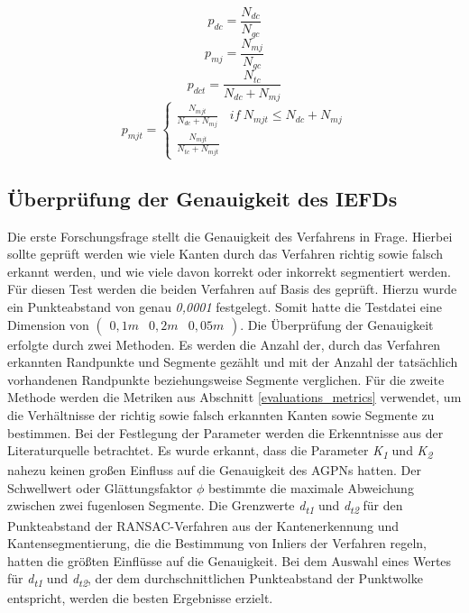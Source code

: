 \begin{equation}
	\label{pdc}
	p_{dc} = \frac{N_{dc}}{N_{gc}}
\end{equation}
\begin{equation}
	\label{pmj}
	p_{mj} = \frac{N_{mj}}{N_{gc}}
\end{equation}
\begin{equation}
	\label{pdct}
	p_{dct} = \frac{N_{tc}}{N_{dc} + N_{mj}}
\end{equation}
\begin{equation}
	\label{pmjt}
	p_{mjt} =
	\begin{cases}
		\frac{N_{mjt}}{N_{dc} + N_{mj}} & if\ N_{mjt} \leq N_{dc} + N_{mj}\\
		\frac{N_{mjt}}{N_{tc} + N_{mjt}}
	\end{cases}
\end{equation}

\subsection{Überprüfung der Genauigkeit des IEFDs}
Die erste Forschungsfrage stellt die Genauigkeit des Verfahrens in Frage. Hierbei sollte geprüft werden wie viele Kanten durch das Verfahren richtig sowie falsch erkannt werden, und wie viele davon korrekt oder inkorrekt segmentiert werden. Für diesen Test werden die beiden Verfahren auf Basis des \testcloud geprüft. Hierzu wurde ein Punkteabstand von genau \textit{0,0001} festgelegt. Somit hatte die Testdatei eine Dimension von $\left(\begin{smallmatrix}
	0,1m & 0,2m & 0,05m
\end{smallmatrix}\right)$. Die Überprüfung der Genauigkeit erfolgte durch zwei Methoden. Es werden die Anzahl der, durch das Verfahren erkannten Randpunkte und Segmente gezählt und mit der Anzahl der tatsächlich vorhandenen Randpunkte beziehungsweise Segmente verglichen. Für die zweite Methode werden die Metriken aus Abschnitt \ref{evaluations_metrics} verwendet, um die Verhältnisse der richtig sowie falsch erkannten Kanten sowie Segmente zu bestimmen. Bei der Festlegung der Parameter werden die Erkenntnisse aus der Literaturquelle betrachtet. Es wurde erkannt, dass die Parameter \textit{K\textsubscript{1}} und \textit{K\textsubscript{2}} nahezu keinen großen Einfluss auf die Genauigkeit des AGPNs hatten. Der Schwellwert oder Glättungsfaktor $\phi$ bestimmte die maximale Abweichung zwischen zwei fugenlosen Segmente. Die Grenzwerte \textit{d\textsubscript{t1}} und \textit{d\textsubscript{t2}} für den Punkteabstand der RANSAC-Verfahren aus der Kantenerkennung und Kantensegmentierung, die die Bestimmung von Inliers der Verfahren regeln, hatten die größten Einflüsse auf die Genauigkeit. Bei dem Auswahl eines Wertes für \textit{d\textsubscript{t1}} und \textit{d\textsubscript{t2}}, der dem durchschnittlichen Punkteabstand der Punktwolke entspricht, werden die besten Ergebnisse erzielt. \autocite[10-11]{ni_edge_2016}

